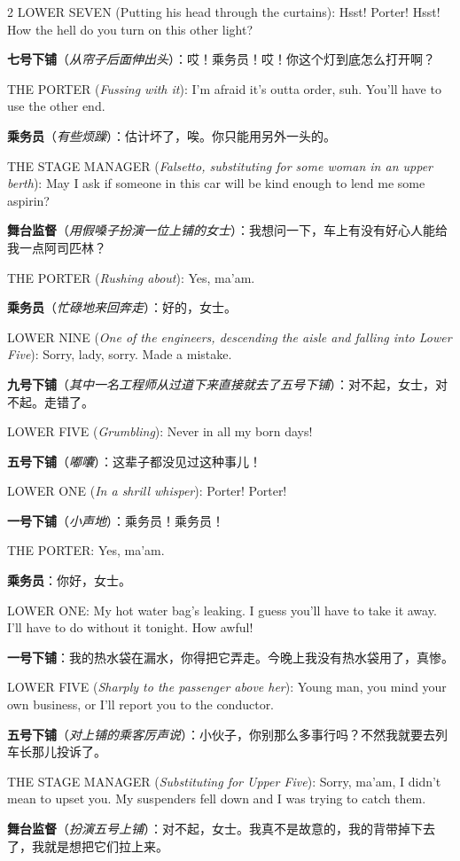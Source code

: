 \documentclass[lang=cn,newtx,10pt,scheme=chinese]{elegantbook}
\newcommand{\pair}[2]{%
\switchcolumn* #2\par
\switchcolumn  #1\par
}
\begin{document}
\begin{paracol}{2}
\pair{
    \textbf{七号下铺}（\textit{从帘子后面伸出头}）：哎！乘务员！哎！你这个灯到底怎么打开啊？
}{
    LOWER SEVEN (Putting his head through the curtains): Hsst! Porter! Hsst! How the hell do you turn on this other light?
}

\pair{
    \textbf{乘务员}（\textit{有些烦躁}）：估计坏了，唉。你只能用另外一头的。
}{
    THE PORTER (\textit{Fussing with it}): I'm afraid it's outta order, suh. You'll have to use the other end.
}

\pair{
    \textbf{舞台监督}（\textit{用假嗓子扮演一位上铺的女士}）：我想问一下，车上有没有好心人能给我一点阿司匹林？
}{
    THE STAGE MANAGER (\textit{Falsetto, substituting for some woman in an upper berth}): May I ask if someone in this car will be kind enough to lend me some aspirin?
}

\pair{
    \textbf{乘务员}（\textit{忙碌地来回奔走}）：好的，女士。
}{
    THE PORTER (\textit{Rushing about}): Yes, ma'am.
}

\pair{
    \textbf{九号下铺}（\textit{其中一名工程师从过道下来直接就去了五号下铺}）：对不起，女士，对不起。走错了。
}{
    LOWER NINE (\textit{One of the engineers, descending the aisle and falling into Lower Five}): Sorry, lady, sorry. Made a mistake.
}

\pair{
    \textbf{五号下铺}（\textit{嘟囔}）：这辈子都没见过这种事儿！
}{
    LOWER FIVE (\textit{Grumbling}): Never in all my born days!
}

\pair{
    \textbf{一号下铺}（\textit{小声地}）：乘务员！乘务员！
}{
    LOWER ONE (\textit{In a shrill whisper}): Porter! Porter!
}

\pair{
    \textbf{乘务员}：你好，女士。
}{
    THE PORTER: Yes, ma'am.
}

\pair{
    \textbf{一号下铺}：我的热水袋在漏水，你得把它弄走。今晚上我没有热水袋用了，真惨。
}{
    LOWER ONE: My hot water bag's leaking. I guess you'll have to take it away. I'll have to do without it tonight. How awful!
}

\pair{
    \textbf{五号下铺}（\textit{对上铺的乘客厉声说}）：小伙子，你别那么多事行吗？不然我就要去列车长那儿投诉了。
}{
    LOWER FIVE (\textit{Sharply to the passenger above her}): Young man, you mind your own business, or I'll report you to the conductor.
}

\pair{
    \textbf{舞台监督}（\textit{扮演五号上铺}）：对不起，女士。我真不是故意的，我的背带掉下去了，我就是想把它们拉上来。
}{
    THE STAGE MANAGER (\textit{Substituting for Upper Five}): Sorry, ma'am, I didn't mean to upset you. My suspenders fell down and I was trying to catch them.
}


\end{paracol}
\end{document}
